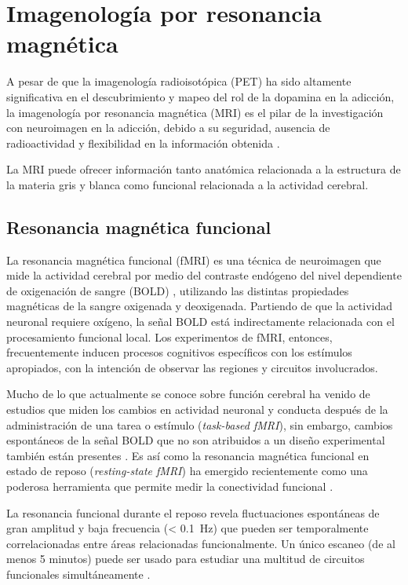 \section{Imagenología por resonancia magnética}
A pesar de que la imagenología radioisotópica (PET) ha sido altamente significativa en el descubrimiento y mapeo del rol de la dopamina en la adicción, la imagenología por resonancia magnética (MRI) es el pilar de la investigación con neuroimagen en la adicción, debido a su seguridad, ausencia de radioactividad y flexibilidad en la información obtenida \parencite{Suckling2017}. \par
La MRI puede ofrecer información tanto anatómica \textemdash{}relacionada a la estructura de la materia gris y blanca\textemdash{} como funcional \textemdash{}relacionada a la actividad cerebral.

\subsection{Resonancia magnética funcional}
La resonancia magnética funcional (fMRI) es una técnica de neuroimagen que mide la actividad cerebral por medio del contraste endógeno del nivel dependiente de oxigenación de sangre (BOLD) \parencite{Ogawa1993}, utilizando las distintas propiedades magnéticas de la sangre oxigenada y deoxigenada.
Partiendo de que la actividad neuronal requiere oxígeno, la señal BOLD está indirectamente relacionada con el procesamiento funcional local.
Los experimentos de fMRI, entonces, frecuentemente inducen procesos cognitivos específicos con los estímulos apropiados, con la intención de observar las regiones y circuitos involucrados. \par
Mucho de lo que actualmente se conoce sobre función cerebral ha venido de estudios que miden los cambios en actividad neuronal y conducta después de la administración de una tarea o estímulo (\textit{task-based fMRI}), sin embargo, cambios espontáneos de la señal BOLD que no son atribuidos a un diseño experimental también están presentes \parencite{Fox2007}.
Es así como la resonancia magnética funcional en estado de reposo (\textit{resting-state fMRI}) ha emergido recientemente como una poderosa herramienta que permite medir la conectividad funcional \parencite{Biswal2010}.\par
La resonancia funcional durante el reposo revela fluctuaciones espontáneas de gran amplitud y baja frecuencia (\deactivatequoting\SI{< 0.1}{\hertz}\activatequoting) que pueden ser temporalmente correlacionadas entre áreas relacionadas funcionalmente.
Un único escaneo (de al menos 5 minutos) puede ser usado para estudiar una multitud de circuitos funcionales simultáneamente \parencite{Biswal2010}.

